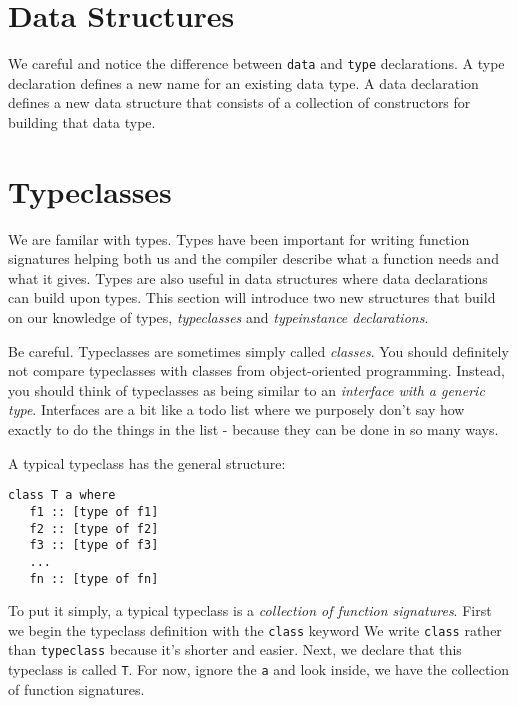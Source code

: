 

\chapter{Data Structures}


We careful and notice the difference between \lstinline{data} and \lstinline{type} declarations.
A type declaration defines a new name for an existing data type.
A data declaration defines a new data structure that consists of a collection of constructors for building that data type.



\chapter{Typeclasses}

We are familar with types. Types have been important for writing function 
signatures helping both us and the compiler describe what a function needs and what it gives.
Types are also useful in data structures where data declarations can build upon types. 	
This section will introduce two new structures that build on our knowledge of types, 
\textit{typeclasses} and \textit{typeinstance declarations}. 


Be careful. Typeclasses are sometimes simply called \textit{classes}. 
You should definitely not compare typeclasses with 
classes from object-oriented programming. Instead, you should think of typeclasses 
as being similar to an \textit{interface with a generic type}. 
Interfaces are a bit like a todo list where we purposely don't say how exactly 
to do the things in the list - because they can be done in so many ways. 

A typical typeclass has the general structure:

\begin{lstlisting}
class T a where
   f1 :: [type of f1]
   f2 :: [type of f2]
   f3 :: [type of f3]
   ...
   fn :: [type of fn]
\end{lstlisting}

To put it simply, a typical typeclass is a \textit{collection of function signatures}.
First we begin the typeclass definition with the \lstinline{class} keyword
We write \lstinline{class} rather than \lstinline{typeclass} because it's shorter and easier.
Next, we declare that this typeclass is called \lstinline{T}. 
For now, ignore the \lstinline{a} and look inside, we have the collection of function signatures. 

